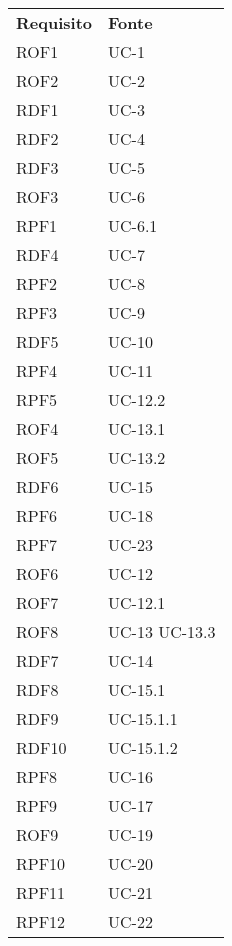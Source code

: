 \begin{longtable}{| p{5cm} | p{5cm} |}
		\rowcolor{LightBlue}
		\color{white}\bfseries Requisito & \color{white}\bfseries Fonte \\[0.25cm]
		\rowcolor{LightGray}
		ROF1 & UC-1 \\
		ROF2 & UC-2 \\
		\rowcolor{LightGray}
		RDF1 & UC-3 \\
		RDF2 & UC-4 \\
		\rowcolor{LightGray}
		RDF3 & UC-5 \\
		ROF3 & UC-6 \\
		\rowcolor{LightGray}
		RPF1 & UC-6.1 \\
		RDF4 & UC-7 \\
		\rowcolor{LightGray}
		RPF2 & UC-8 \\
		RPF3 & UC-9 \\
		\rowcolor{LightGray}
		RDF5 & UC-10 \\
		RPF4 & UC-11 \\
		\rowcolor{LightGray}
		RPF5 &UC-12.2 \\
		ROF4 & UC-13.1 \\
		\rowcolor{LightGray}
		ROF5 & UC-13.2 \\
		RDF6 & UC-15 \\
		\rowcolor{LightGray}
		RPF6 & UC-18 \\
		RPF7 & UC-23 \\
		\rowcolor{LightGray}
		ROF6 & UC-12 \\
		ROF7 & UC-12.1 \\
		\rowcolor{LightGray}
		ROF8 & UC-13 \newline UC-13.3 \\
		RDF7 & UC-14\\
		\rowcolor{LightGray}
		RDF8 & UC-15.1\\
		RDF9 & UC-15.1.1\\
		\rowcolor{LightGray}
		RDF10 & UC-15.1.2\\
		RPF8 & UC-16\\
		\rowcolor{LightGray}
		RPF9 & UC-17\\
		ROF9 & UC-19 \\
		\rowcolor{LightGray}
		RPF10 & UC-20\\
		RPF11 & UC-21 \\
		\rowcolor{LightGray}
		RPF12 & UC-22 \\ 
		\hline
\end{longtable}

